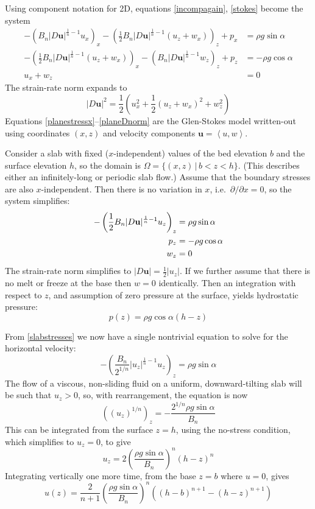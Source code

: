 \documentclass[letterpaper,final,12pt,reqno]{amsart}
\newcommand{\bu}{\mathbf{u}}
\begin{document}
Using component notation for 2D, equations \eqref{incompagain}, \eqref{stokes} become the system
\begin{align}
- \left(B_n |D\bu|^{\frac{1}{n}-1} u_x\right)_x - \left(\frac{1}{2} B_n |D\bu|^{\frac{1}{n}-1} \left(u_z+w_x\right)\right)_z + p_x &= \rho g\sin\alpha \label{planestressx} \\
- \left(\frac{1}{2} B_n |D\bu|^{\frac{1}{n}-1} \left(u_z+w_x\right)\right)_x - \left(B_n |D\bu|^{\frac{1}{n}-1} w_z\right)_z + p_z &= -\rho g\cos\alpha \label{planestressz} \\
u_x + w_z &= 0 \label{planeincomp}
\end{align}
The strain-rate norm expands to
\begin{equation}
    |D\bu|^2 = \frac{1}{2} \left(u_x^2 + \frac{1}{2}(u_z+w_x)^2 + w_z^2\right)  \label{planeDnorm}
\end{equation}
Equations \eqref{planestressx}--\eqref{planeDnorm} are the Glen-Stokes model written-out using coordinates $(x,z)$ and velocity components $\bu=\left<u,w\right>$.

Consider a slab with fixed ($x$-independent) values of the bed elevation $b$ and the surface elevation $h$, so the domain is $\Omega = \{(x,z)\,|\,b < z < h\}$.  (This describes either an infinitely-long or periodic slab flow.)  Assume that the boundary stresses are also $x$-independent.  Then there is no variation in $x$, i.e.~$\partial/\partial x=0$, so the system simplifies:
\begin{align}
- \left(\frac{1}{2}B_n |D\bu|^{\frac{1}{n}-1} u_z\right)_z &= \rho g\sin\alpha \label{slabstresses} \\
p_z &= -\rho g\cos\alpha \notag \\
w_z &= 0 \notag
\end{align}
The strain-rate norm simplifies to $|D\bu| = \frac{1}{2} |u_z|$.  If we further assume that there is no melt or freeze at the base then $w=0$ identically.  Then an integration with respect to $z$, and assumption of zero pressure at the surface, yields hydrostatic pressure:
\begin{equation}
p(z) = \rho g\cos\alpha (h-z)  \label{pslab}
\end{equation}

From \eqref{slabstresses} we now have a single nontrivial equation to solve for the horizontal velocity:
    $$- \left(\frac{B_n}{2^{1/n}} |u_z|^{\frac{1}{n}-1} u_z\right)_z = \rho g\sin\alpha$$
The flow of a viscous, non-sliding fluid on a uniform, downward-tilting slab will be such that $u_z>0$, so, with rearrangement, the equation is now
    $$\left((u_z)^{1/n} \right)_z = - \frac{2^{1/n} \rho g\sin\alpha}{B_n}$$
This can be integrated from the surface $z=h$, using the no-stress condition, which simplifies to $u_z=0$, to give
\begin{equation}
u_z = 2 \left(\frac{\rho g\sin\alpha}{B_n}\right)^n (h-z)^n  \label{uzslab}
\end{equation}
Integrating vertically one more time, from the base $z=b$ where $u=0$, gives
\begin{equation}
u(z) = \frac{2}{n+1} \left(\frac{\rho g\sin\alpha}{B_n}\right)^n \left((h-b)^{n+1} - (h-z)^{n+1}\right)  \label{uslab}
\end{equation}
\end{document}
